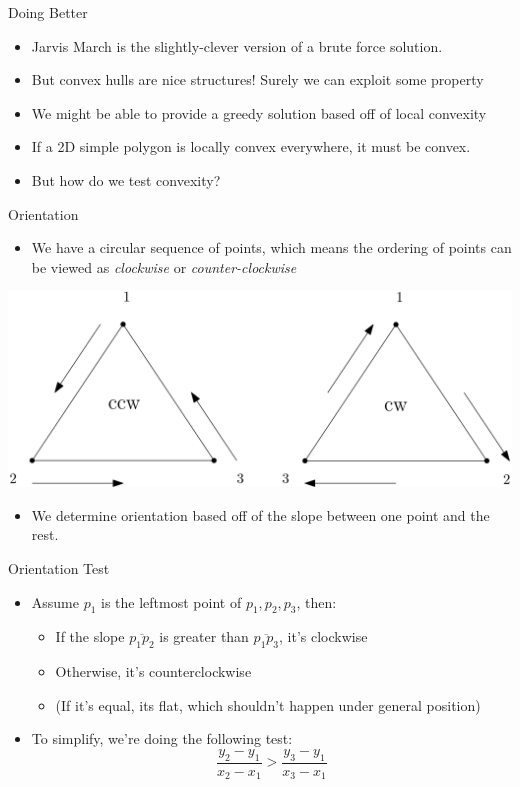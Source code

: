 \documentclass[aspectratio=169]{beamer}
\begin{document}
\begin{frame}{Doing Better}
    \begin{itemize}
        \item Jarvis March is the slightly-clever version of a brute force solution. \pause
        \item But convex hulls are nice structures! Surely we can exploit some property \pause
        \item We might be able to provide a greedy solution based off of local convexity \pause
        \item If a 2D simple polygon is locally convex everywhere, it must be convex. \pause
        \item But how do we test convexity?
    \end{itemize}
\end{frame}

\begin{frame}{Orientation}
\begin{itemize}
    \item We have a circular sequence of points, which means the ordering of points can be viewed as \textit{clockwise} or \textit{counter-clockwise}
\end{itemize}
\begin{center}
    \includegraphics[width=.5\textwidth]{orientation.png}
\end{center}
\begin{itemize}
    \item We determine orientation based off of the slope between one point and the rest.
\end{itemize}
\end{frame}

\begin{frame}{Orientation Test}
    \begin{itemize}
        \item Assume $p_1$ is the leftmost point of $p_1,p_2,p_3$, then:
        \begin{itemize}
            \item If the slope $\overline{p_1p_2}$ is greater than $\overline{p_1p_3}$, it's clockwise
            \item Otherwise, it's counterclockwise \pause 
            \item (If it's equal, its flat, which shouldn't happen under general position)
        \end{itemize}
        \item To simplify, we're doing the following test: $$\frac{y_2-y_1}{x_2-x_1} > \frac{y_3 - y_1}{x_3-x_1}$$
    \end{itemize}
\end{frame}
\end{document}
